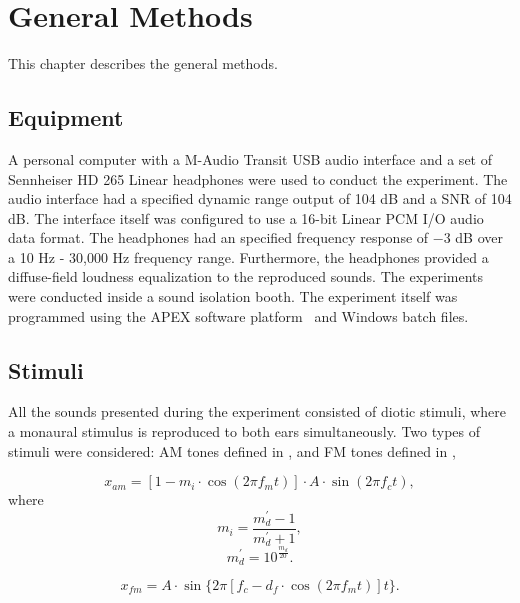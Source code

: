 \documentclass[../main.tex]{subfiles}
\begin{document}
\chapter{General Methods}
\label{cha:methods}

This chapter describes the general methods.

\section{Equipment}

A personal computer with a M-Audio Transit USB audio interface
\cite{maudio:transitusb} and a set of Sennheiser HD 265 Linear headphones
\cite{sennheiser:hd265linear} were used to conduct the experiment. The audio
interface had a specified dynamic range output of 104 dB and a \gls{SNR} of 104
dB. The interface itself was configured to use a 16-bit Linear \gls{PCM}
\gls{I/O} audio data format. The headphones had an specified frequency response
of $-3$ dB over a 10 Hz - 30,000 Hz frequency range. Furthermore, the headphones
provided a diffuse-field loudness equalization to the reproduced sounds. The
experiments were conducted inside a sound isolation booth. The experiment itself
was programmed using the APEX software platform~\cite{Francart2008} and Windows
batch files.

\section{Stimuli}
\label{sec:stimuli}

All the sounds presented during the experiment consisted of diotic stimuli,
where a monaural stimulus is reproduced to both ears simultaneously. Two types
of stimuli were considered: \gls{AM} tones defined in , and \gls{FM}
tones defined in ,

\begin{equation}
  x_{am} = [1 - m_i \cdot \cos(2 \pi f_m t)] \cdot A \cdot \sin(2 \pi f_c t),
  \label{eq:am}
\end{equation}
where
\begin{equation}
  m_i = \frac{m_d^{\prime}-1}{m_d^{\prime}+1},
\end{equation}
\begin{equation}
  m_d^{\prime} = 10^{\frac{m_d}{20}}.
\end{equation}

\begin{equation}
  x_{fm} = A \cdot \sin \{2 \pi [f_c - d_f \cdot \cos(2 \pi f_m t)] t \}.
  \label{eq:fm}
\end{equation}
\end{document}
